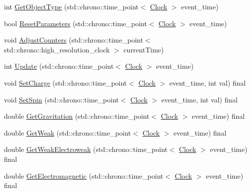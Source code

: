 \begin{DoxyCompactItemize}
\item 
int \mbox{\hyperlink{classDimension_a72f494215a114cb43cecd9b170bcde51}{Get\+Object\+Type}} (std\+::chrono\+::time\+\_\+point$<$ \mbox{\hyperlink{universe_8h_a0ef8d951d1ca5ab3cfaf7ab4c7a6fd80}{Clock}} $>$ event\+\_\+time)
\item 
bool \mbox{\hyperlink{classDimension_af83732dba929ae01aca457e7d6121374}{Reset\+Parameters}} (std\+::chrono\+::time\+\_\+point$<$ \mbox{\hyperlink{universe_8h_a0ef8d951d1ca5ab3cfaf7ab4c7a6fd80}{Clock}} $>$ event\+\_\+time)
\item 
void \mbox{\hyperlink{classDimension_a31e28c2777888449fad32843f6dd15ed}{Adjust\+Counters}} (std\+::chrono\+::time\+\_\+point$<$ std\+::chrono\+::high\+\_\+resolution\+\_\+clock $>$ current\+Time)
\item 
int \mbox{\hyperlink{classDimension_a663916c2573b6df4db02ccee5678a75d}{Update}} (std\+::chrono\+::time\+\_\+point$<$ \mbox{\hyperlink{universe_8h_a0ef8d951d1ca5ab3cfaf7ab4c7a6fd80}{Clock}} $>$ event\+\_\+time)
\item 
void \mbox{\hyperlink{classDimension_a6d3f7fa4a26b92d8ae6161a1b8bb8220}{Set\+Charge}} (std\+::chrono\+::time\+\_\+point$<$ \mbox{\hyperlink{universe_8h_a0ef8d951d1ca5ab3cfaf7ab4c7a6fd80}{Clock}} $>$ event\+\_\+time, int val) final
\item 
void \mbox{\hyperlink{classDimension_a8d73c050c67b0226572b4a1b08ae6594}{Set\+Spin}} (std\+::chrono\+::time\+\_\+point$<$ \mbox{\hyperlink{universe_8h_a0ef8d951d1ca5ab3cfaf7ab4c7a6fd80}{Clock}} $>$ event\+\_\+time, int val) final
\item 
double \mbox{\hyperlink{classDimension_a652220a2eb1b26c749ad032865d81788}{Get\+Gravitation}} (std\+::chrono\+::time\+\_\+point$<$ \mbox{\hyperlink{universe_8h_a0ef8d951d1ca5ab3cfaf7ab4c7a6fd80}{Clock}} $>$ event\+\_\+time) final
\item 
double \mbox{\hyperlink{classDimension_a656ce92d07ea600cc0ec53865ad515e2}{Get\+Weak}} (std\+::chrono\+::time\+\_\+point$<$ \mbox{\hyperlink{universe_8h_a0ef8d951d1ca5ab3cfaf7ab4c7a6fd80}{Clock}} $>$ event\+\_\+time) final
\item 
double \mbox{\hyperlink{classDimension_a5bb5a164564013a60728854cc2e5ddb3}{Get\+Weak\+Electroweak}} (std\+::chrono\+::time\+\_\+point$<$ \mbox{\hyperlink{universe_8h_a0ef8d951d1ca5ab3cfaf7ab4c7a6fd80}{Clock}} $>$ event\+\_\+time) final
\item 
double \mbox{\hyperlink{classDimension_a21783c29a576518b722512f1245fa598}{Get\+Electromagnetic}} (std\+::chrono\+::time\+\_\+point$<$ \mbox{\hyperlink{universe_8h_a0ef8d951d1ca5ab3cfaf7ab4c7a6fd80}{Clock}} $>$ event\+\_\+time) final

\end{DoxyCompactItemize}
